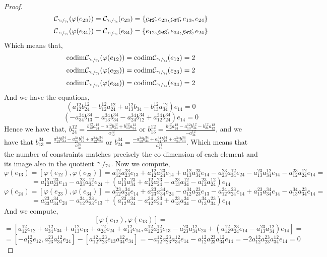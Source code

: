 \documentclass[12pt,fleqn]{article}
\begin{document}
\begin{proof}
\[\mathcal{C}_{\sfrac{\gamma_1}{\gamma_4}}(\varphi(e_{23}))=\mathcal{C}_{\sfrac{\gamma_1}{\gamma_4}}(e_{23})=\{\cancel{e_{12}},e_{23},\cancel{e_{34}},e_{13},e_{24}\}\]
\[\mathcal{C}_{\sfrac{\gamma_1}{\gamma_4}}(\varphi(e_{34}))=\mathcal{C}_{\sfrac{\gamma_1}{\gamma_4}}(e_{34})=\{e_{12},\cancel{e_{23}},e_{34},\cancel{e_{13}},e_{24}\}\]
Which means that,
\[\mathrm{codim}\mathcal{C}_{\sfrac{\gamma_1}{\gamma_4}}(\varphi(e_{12}))=\mathrm{codim}\mathcal{C}_{\sfrac{\gamma_1}{\gamma_4}}(e_{12})=2\]
\[\mathrm{codim}\mathcal{C}_{\sfrac{\gamma_1}{\gamma_4}}(\varphi(e_{23}))=\mathrm{codim}\mathcal{C}_{\sfrac{\gamma_1}{\gamma_4}}(e_{23})=2\]
\[\mathrm{codim}\mathcal{C}_{\sfrac{\gamma_1}{\gamma_4}}(\varphi(e_{34}))=\mathrm{codim}\mathcal{C}_{\sfrac{\gamma_1}{\gamma_4}}(e_{34})=2\]
And we have the equations,
\[( a_{12}^{12}b_{24}^{12}- b_{12}^{12}a_{24}^{12}+a_{13}^{12}b_{34}-b_{13}^{12}a_{34}^{12})e_{14}=0\]
\[(-a_{34}^{34}b_{13}^{34}+a_{13}^{34}b_{34}^{34}-a_{24}^{34}b_{12}^{34}+a_{12}^{34}b_{24}^{34})e_{14}=0\]
Hence we have that,
$b_{24}^{12}=\frac{ b_{12}^{12}a_{24}^{12}-a_{13}^{12}b_{34}^{12}+b_{13}^{12}a_{34}^{12}}{ a_{12}^{12}}$ or $b_{13}^{12}=\frac{ b_{12}^{12}a_{24}^{12}-a_{13}^{12}b_{34}^{12}-b_{24}^{12}a_{12}^{12}}{-a_{34}^{12}}$, and we have that $b_{13}^{34}=\frac{a_{13}^{34}b_{34}^{34}-a_{24}^{34}b_{12}^{34}+a_{12}^{34}b_{24}^{34}}{a_{34}^{34}}$ or
$b_{24}^{34}=\frac{-a_{13}^{34}b_{34}^{34}+a_{24}^{34}b_{12}^{34}+a_{34}^{34}b_{13}^{34}}{a_{12}^{34}}$.
Which means that the number of constraints matches precisely the co dimension of each element and its image also in the quotient $\sfrac{\gamma_1}{\gamma_4}$. 
Now we compute,
\[\varphi(e_{13})=[\varphi(e_{12}),\varphi(e_{23})]= a_{12}^{12}a_{23}^{23}e_{13}+a_{12}^{12}a_{24}^{23}e_{14}+a_{13}^{12}a_{34}^{23}e_{14}-a_{23}^{23}a_{34}^{12}e_{24}-a_{13}^{23}a_{34}^{12}e_{14}-a_{12}^{23}a_{24}^{12}e_{14}=\]\[=a_{12}^{12}a_{23}^{23}e_{13}-a_{23}^{23}a_{34}^{12}e_{24}+(a_{13}^{12}a_{34}^{23}+a_{12}^{12}a_{24}^{23}-a_{13}^{23}a_{34}^{12}-a_{12}^{23}a_{24}^{12})e_{14}\]
\[\varphi(e_{24})=[\varphi(e_{23}),\varphi(e_{34})]= a_{12}^{23}a_{24}^{34}e_{14}+a_{23}^{23}a_{34}^{34}e_{24}-a_{12}^{34}a_{23}^{23}e_{13}-a_{12}^{34}a_{24}^{23}e_{14}+a_{13}^{23}a_{34}^{34}e_{14}-a_{13}^{34}a_{34}^{23}e_{14}=\]\[=
a_{23}^{23}a_{34}^{34}e_{24}-a_{12}^{34}a_{23}^{23}e_{13}+(a_{12}^{23}a_{24}^{34}-a_{12}^{34}a_{24}^{23}+a_{13}^{23}a_{34}^{34}-a_{13}^{34}a_{34}^{23})e_{14}\]
And we compute,
\[
[\varphi(e_{12}),\varphi(e_{13})]=\]\[=[a_{12}^{12}e_{12}+a_{34}^{12}e_{34}+a_{13}^{12}e_{13}+a_{24}^{12}e_{24}+a_{14}^{12}e_{14},a_{12}^{12}a_{23}^{12}e_{13}-a_{23}^{23}a_{34}^{12}e_{24}+(a_{12}^{12}a_{24}^{23}e_{14}-a_{13}^{23}a_{34}^{12})e_{14}]=\]\[=[-a_{12}^{12}e_{12},a_{23}^{23}a_{34}^{12}e_{24}]-[a_{12}^{12}a_{23}^{23}e_{13}a_{34}^{12}e_{34}]=-a_{12}^{12}a_{23}^{23}a_{34}^{12}e_{14}-a_{12}^{12}a_{23}^{23}a_{34}^{12}e_{14}=-2a_{12}^{12}a_{23}^{23}a_{34}^{12}e_{14}=0
\]
\end{proof}
\end{document}
